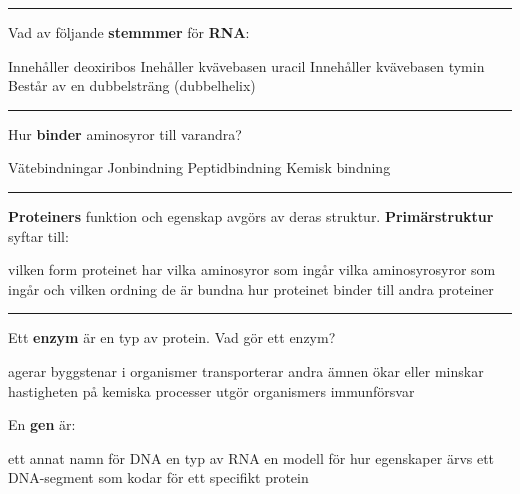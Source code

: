 \documentclass{exam}
\begin{document}
\begin{questions}
\vspace{5mm} %
\hrule
\vspace{5mm} %

\question Vad av följande \textbf{stemmmer} för \textbf{RNA}:
\begin{checkboxes}
   \choice Innehåller deoxiribos
   \correctchoice Inehåller kvävebasen uracil
   \choice Innehåller kvävebasen tymin
   \choice Består av en dubbelsträng (dubbelhelix)
\end{checkboxes}

\vspace{5mm} %
\hrule 
\vspace{5mm} %
\question Hur \textbf{binder} aminosyror till varandra?
\begin{checkboxes}
   \choice Vätebindningar
   \choice Jonbindning
   \correctchoice Peptidbindning
   \choice Kemisk bindning
\end{checkboxes}

\vspace{5mm} %
\hrule 
\vspace{5mm} %


\question \textbf{Proteiners} funktion och egenskap avgörs av deras struktur. \textbf{Primärstruktur} syftar till:  
\begin{checkboxes}
   \choice vilken form proteinet har
   \choice vilka aminosyror som ingår
   \correctchoice vilka aminosyrosyror som ingår och vilken ordning de är bundna
   \choice hur proteinet binder till andra proteiner
\end{checkboxes}
\vspace{5mm} %
\hrule 
\vspace{5mm} %
\question Ett \textbf{enzym} är en typ av protein. Vad gör ett enzym?  
\begin{checkboxes}
   \choice agerar byggstenar i organismer
   \choice transporterar andra ämnen
   \correctchoice ökar eller minskar hastigheten på kemiska processer
   \choice utgör organismers immunförsvar
\end{checkboxes}

\break

\question En \textbf{gen} är:  
\begin{checkboxes}
   \choice ett annat namn för DNA
   \choice en typ av RNA
   \choice en modell för hur egenskaper ärvs
   \correctchoice ett DNA-segment som kodar för ett specifikt protein
\end{checkboxes}


\end{questions}
\end{document}

